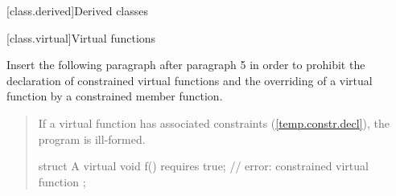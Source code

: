 
\setcounter{chapter}{12}
[class.derived]{Derived classes}

\setcounter{section}{2}
[class.virtual]{Virtual functions}

Insert the following paragraph after paragraph 5 in order to
prohibit the declaration of constrained virtual functions and
the overriding of a virtual function by a constrained member
function.

\begin{quote}
\begin{addedblock}
\setcounter{Paras}{5}

\pnum
If a virtual function has associated constraints (\ref{temp.constr.decl}), the 
program is ill-formed.
%
\enterexample
\begin{codeblock}
struct A {
  virtual void f() requires true; // error: constrained virtual function
};
\end{codeblock}
\exitexample
\end{addedblock}
\end{quote}

